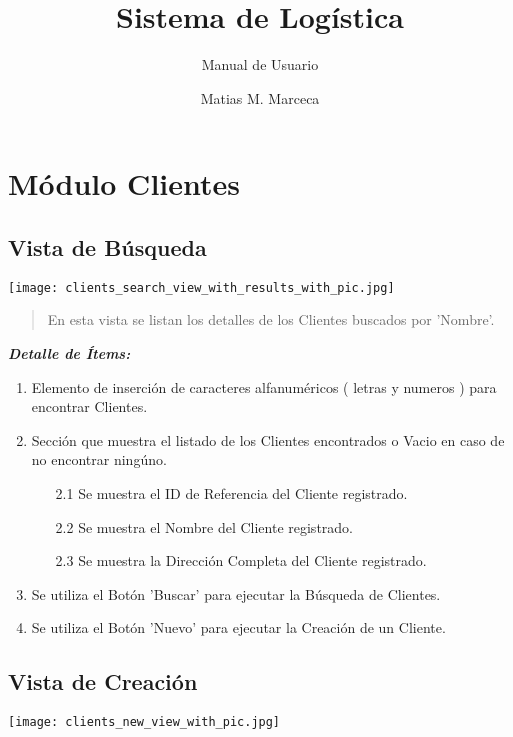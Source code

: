 \documentclass[
10pt, %
a4paper, %
oneside, %
headinclude,footinclude, %
BCOR5mm, %
]{scrartcl}
\title{Sistema de Log\'istica}
\subtitle{Manual de Usuario}
\author{Matias M. Marceca}
\date{}
\begin{document}
\maketitle
\tableofcontents
\pagebreak

\section{M\'odulo Clientes}
\subsection{Vista de B\'usqueda}

 \begin{flushleft}
     \texttt{[image: clients\_search\_view\_with\_results\_with\_pic.jpg]}
 \end{flushleft}

 \begin{quotation}
   En esta vista se listan los detalles de los Clientes buscados por \newline
   'Nombre'.
 \end{quotation}

\pagebreak

 \textbf{ \emph{Detalle de \'Items:} }
 \begin{enumerate}
   \item  Elemento de inserci\'on de caracteres alfanum\'ericos
     ( letras y numeros ) para encontrar Clientes.
   \item  Secci\'on que muestra el listado de los Clientes encontrados
      o Vacio en caso de no encontrar ning\'uno.

   \begin{enumerate}
     \item[2.1] Se muestra el ID de Referencia del Cliente registrado.
     \item[2.2] Se muestra el Nombre del Cliente registrado.
     \item[2.3] Se muestra la Direcci\'on Completa del Cliente registrado.
    \end{enumerate}

   \item Se utiliza el Bot\'on 'Buscar' para ejecutar la B\'usqueda de Clientes.
   \item Se utiliza el Bot\'on 'Nuevo' para ejecutar la Creaci\'on de un Cliente.
  \end{enumerate}

\subsection{Vista de Creaci\'on}
 \begin{flushleft}
     \texttt{[image: clients\_new\_view\_with\_pic.jpg]}
 \end{flushleft}
\end{document}

